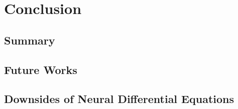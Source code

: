 \chapter{Conclusion}
\label{chapter:conclusion}

\section{Summary}
\label{sec:summary}

\section{Future Works}
\label{sec:future_works}

\section{Downsides of Neural Differential Equations}
\label{sec:downsides}


